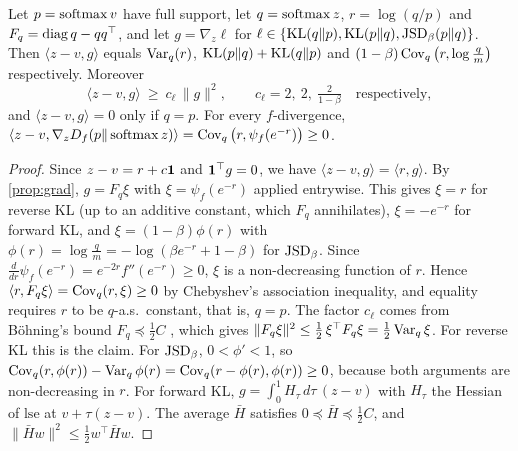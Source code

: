 \begin{lemma}\label{lem:directed}
\Pv\Ck Let $p=\operatorname{softmax} v$ have full support, let $q=\operatorname{softmax} z$, $r=\log(q/p)$ and $F_q=\operatorname{diag} q-qq^\top$, and let $g=\nabla_z\ell$ for
$\ell\in\{\mathrm{KL}(q\|p),\mathrm{KL}(p\|q),\mathrm{JSD}_\beta(p\|q)\}$. Then $\langle z-v,g\rangle$ equals $\operatorname{Var}_q(r)$, $\mathrm{KL}(p\|q)+\mathrm{KL}(q\|p)$ and
$(1-\beta)\operatorname{Cov}_q\big(r,\log\frac qm\big)$ respectively. Moreover
\[
\langle z-v,g\rangle\ \ge\ c_\ell\,\|g\|^2,\qquad c_\ell=2,\ 2,\ \tfrac{2}{1-\beta}\quad\text{respectively},
\]
and $\langle z-v,g\rangle=0$ only if $q=p$. For every $f$-divergence, $\langle z-v,\nabla_zD_f(p\|\operatorname{softmax} z)\rangle=\operatorname{Cov}_q\big(r,\psi_f(e^{-r})\big)\ge0$.
\end{lemma}
\begin{proof}
Since $z-v=r+c\mathbf{1}$ and $\mathbf{1}^\top g=0$, we have $\langle z-v,g\rangle=\langle r,g\rangle$. By \cref{prop:grad}, $g=F_q\xi$ with $\xi=\psi_f(e^{-r})$
applied entrywise. This gives $\xi=r$ for reverse KL (up to an additive constant, which $F_q$ annihilates), $\xi=-e^{-r}$ for forward KL, and $\xi=(1-\beta)\phi(r)$ with $\phi(r)=\log\frac qm=-\log(\beta e^{-r}+1-\beta)$ for $\mathrm{JSD}_\beta$.
Since $\frac{d}{dr}\psi_f(e^{-r})=e^{-2r}f''(e^{-r})\ge0$, $\xi$ is a non-decreasing function of $r$. Hence $\langle r,F_q\xi\rangle=\operatorname{Cov}_q(r,\xi)\ge0$ by
Chebyshev's association inequality, and equality requires $r$ to be $q$-a.s.\ constant, that is, $q=p$. The factor $c_\ell$ comes from
Böhning's bound $F_q\preceq\frac12C$ \citep{bohning1992multinomial}, which gives $\|F_q\xi\|^2\le\frac12\,\xi^\top F_q\xi=\frac12\operatorname{Var}_q\xi$. For reverse KL
this is the claim. For $\mathrm{JSD}_\beta$, $0<\phi'<1$, so $\operatorname{Cov}_q(r,\phi(r))-\operatorname{Var}_q\phi(r)=\operatorname{Cov}_q(r-\phi(r),\phi(r))\ge0$, because both arguments
are non-decreasing in $r$. For forward KL, $g=\int_0^1H_\tau\,d\tau\,(z-v)$ with $H_\tau$ the Hessian of $\mathrm{lse}$ at $v+\tau(z-v)$. The
average $\bar H$ satisfies $0\preceq\bar H\preceq\frac12C$, and $\|\bar Hw\|^2\le\frac12w^\top\bar Hw$.
\end{proof}

